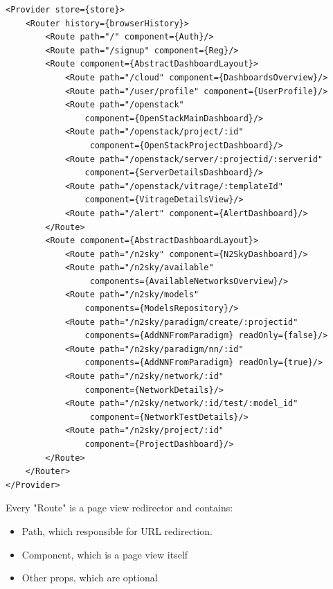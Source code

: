 \begin{lstlisting}[caption=React Router]
<Provider store={store}>
	<Router history={browserHistory}>
		<Route path="/" component={Auth}/>
		<Route path="/signup" component={Reg}/>
		<Route component={AbstractDashboardLayout}>
			<Route path="/cloud" component={DashboardsOverview}/>
			<Route path="/user/profile" component={UserProfile}/>
			<Route path="/openstack" 
				component={OpenStackMainDashboard}/>
			<Route path="/openstack/project/:id"
				 component={OpenStackProjectDashboard}/>
			<Route path="/openstack/server/:projectid/:serverid" 
				component={ServerDetailsDashboard}/>
			<Route path="/openstack/vitrage/:templateId" 
				component={VitrageDetailsView}/>
			<Route path="/alert" component={AlertDashboard}/>
		</Route>
		<Route component={AbstractDashboardLayout}>
			<Route path="/n2sky" component={N2SkyDashboard}/>
			<Route path="/n2sky/available"
				 components={AvailableNetworksOverview}/>
			<Route path="/n2sky/models" 
				components={ModelsRepository}/>
			<Route path="/n2sky/paradigm/create/:projectid" 
				components={AddNNFromParadigm} readOnly={false}/>
			<Route path="/n2sky/paradigm/nn/:id" 
				components={AddNNFromParadigm} readOnly={true}/>
			<Route path="/n2sky/network/:id" 
				component={NetworkDetails}/>
			<Route path="/n2sky/network/:id/test/:model_id"
				 component={NetworkTestDetails}/>
			<Route path="/n2sky/project/:id"
				component={ProjectDashboard}/>
		</Route>
	</Router>
</Provider>
\end{lstlisting}

Every "Route" is a page view redirector and contains:
\begin{itemize}
\item Path, which responsible for URL redirection.
\item Component, which is a page view itself
\item Other props, which are optional
\end{itemize}

